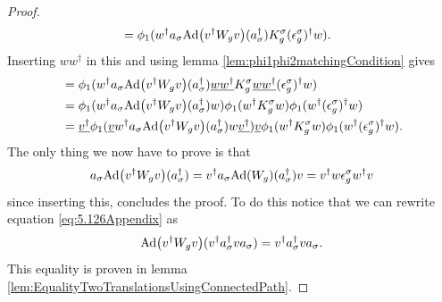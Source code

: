 \documentclass[11pt,a4paper,twoside]{article}
\numberwithin{equation}{section}
\begin{document}
\begin{proof}
\begin{align}
			&=\phi_1(w^\dagger a_\sigma \Ad{v^\dagger W_g v}(a_\sigma^\dagger)K_g^\sigma  (\epsilon_g^\sigma)^\dagger w).
		\end{align}
		Inserting $w w^\dagger$ in this and using lemma \ref{lem:phi1phi2matchingCondition} gives
		\begin{align}
			&=\phi_1(w^\dagger a_\sigma \Ad{v^\dagger W_g v}(a_\sigma^\dagger)\underline{w w^\dagger}K_g^\sigma \underline{w w^\dagger}  (\epsilon_g^\sigma)^\dagger w)\\
			&=\phi_1(w^\dagger a_\sigma \Ad{v^\dagger W_g v}(a_\sigma^\dagger)w)\phi_1( w^\dagger K_g^\sigma w ) \phi_1( w^\dagger  (\epsilon_g^\sigma)^\dagger w)\\
			&=\underline{v^\dagger}\phi_1(\underline{v} w^\dagger a_\sigma \Ad{v^\dagger W_g v}(a_\sigma^\dagger)w \underline{v^\dagger})\underline{v}\phi_1( w^\dagger K_g^\sigma w ) \phi_1( w^\dagger  (\epsilon_g^\sigma)^\dagger w).
		\end{align}
		The only thing we now have to prove is that
		\begin{equation}\label{eq:5.126Appendix}
			a_\sigma \Ad{v^\dagger W_g v}(a_\sigma^\dagger)=v^\dagger a_\sigma \Ad{W_g}(a_\sigma^\dagger)v=v^\dagger w \epsilon_g^\sigma w^\dagger v
		\end{equation}
		since inserting this, concludes the proof. To do this notice that we can rewrite equation \eqref{eq:5.126Appendix} as
		\begin{equation}
			\Ad{v^\dagger W_g v}(v^\dagger a_\sigma^\dagger v a_\sigma)=v^\dagger a_\sigma^\dagger v a_\sigma.
		\end{equation}
		This equality is proven in lemma \ref{lem:EqualityTwoTranslationsUsingConnectedPath}.
	\end{proof}
\end{document}
